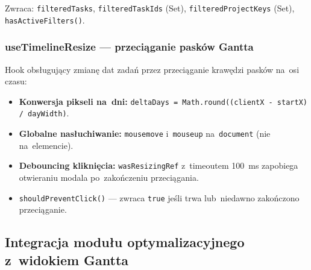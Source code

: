 Zwraca: \texttt{filteredTasks}, \texttt{filteredTaskIds} (Set), \texttt{filteredProjectKeys} (Set), \texttt{hasActiveFilters()}.

\subsubsection{useTimelineResize --- przeciąganie pasków Gantta}

Hook obsługujący zmianę dat zadań przez przeciąganie krawędzi pasków na~osi czasu:

\begin{itemize}
    \item \textbf{Konwersja pikseli na~dni:} \texttt{deltaDays = Math.round((clientX - startX) / dayWidth)}.
    \item \textbf{Globalne nasłuchiwanie:} \texttt{mousemove} i~\texttt{mouseup} na~\texttt{document} (nie na~elemencie).
    \item \textbf{Debouncing kliknięcia:} \texttt{wasResizingRef} z~timeoutem 100~ms zapobiega otwieraniu modala po~zakończeniu przeciągania.
    \item \texttt{shouldPreventClick()} --- zwraca \texttt{true} jeśli trwa lub~niedawno zakończono przeciąganie.
\end{itemize}

\subsection{Integracja modułu optymalizacyjnego z~widokiem Gantta}

